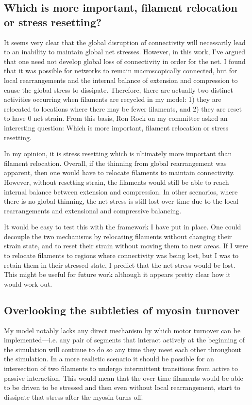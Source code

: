 \subsection{Which is more important, filament relocation or stress resetting?}
It seems very clear that the global disruption of connectivity will necessarily lead to an inability to maintain global net stresses.  However, in this work, I've argued that one need not develop global loss of connectivity in order for the net. I found that it was possible for networks to remain macroscopically connected, but for local rearrangements and the internal balance of extension and compression to cause the global stress to dissipate.  Therefore, there are actually two distinct activities occurring when filaments are recycled in my model: 1) they are relocated to locations where there may be fewer filaments, and 2) they are reset to have 0 net strain.  From this basis, Ron Rock on my committee asked an interesting question: Which is more important, filament relocation or stress resetting.

In my opinion, it is stress resetting which is ultimately more important than filament relocation.  Overall, if the thinning from global rearrangement was apparent, then one would have to relocate filaments to maintain connectivity.  However, without resetting strain, the filaments would still be able to reach internal balance between extension and compression.  In other scenarios, where there is no global thinning, the net stress is still lost over time due to the local rearrangements and extensional and compressive balancing.

It would be easy to test this with the framework I have put in place.  One could decouple the two mechanisms by relocating filaments without changing their strain state, and to reset their strain without moving them to new areas.  If I were to relocate filaments to regions where connectivity was being lost, but I was to retain them in their stressed state, I predict that the net stress would be lost.  This might be useful for future work although it appears pretty clear how it would work out.


\subsection{Overlooking the subtleties of myosin turnover}
My model notably lacks any direct mechanism by which motor turnover can be implemented---i.e. any pair of segments that interact actively at the beginning of the simulation will continue to do so any time they meet each other throughout the simulation. In a more realistic scenario it should be possible for an intersection of two filaments to undergo intermittent transitions from active to passive interaction.  This would mean that the over time filaments would be able to be driven to be stressed and then even without local rearrangement, start to dissipate that stress after the myosin turns off.

